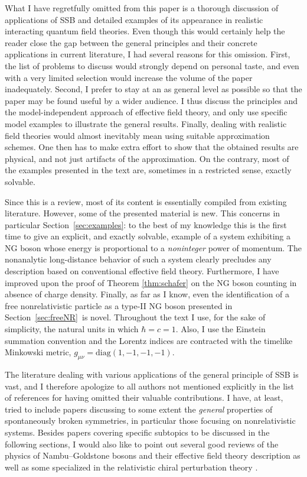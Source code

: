 \documentclass[final,3p,times,12pt,a4paper,sort&compress]{elsarticle}
\begin{document}
What I have regretfully omitted from this paper is a thorough discussion of
applications of SSB and detailed examples of its appearance in realistic
interacting quantum field theories. Even though this would certainly help the
reader close the gap between the general principles and their concrete
applications in current literature, I had several reasons for this omission.
First, the list of problems to discuss would strongly depend on personal taste,
and even with a very limited selection would increase the volume of the paper
inadequately. Second, I prefer to stay at an as general level as possible so
that the paper may be found useful by a wider audience. I thus discuss the
principles and the model-independent approach of effective field theory, and
only use specific model examples to illustrate the general results. Finally,
dealing with realistic field theories would almost inevitably mean using
suitable approximation schemes. One then has to make extra effort to show that
the obtained results are physical, and not just artifacts of the approximation.
On the contrary, most of the examples presented in the text are, sometimes in a
restricted sense, exactly solvable.

Since this is a review, most of its content is essentially compiled from
existing literature. However, some of the presented material is new. This
concerns in particular Section~\ref{sec:examples}: to the best of my knowledge
this is the first time to give an explicit, and exactly solvable, example of a
system exhibiting a NG boson whose energy is proportional to a \emph{noninteger}
power of momentum. The nonanalytic long-distance behavior of such a system
clearly precludes any description based on conventional effective field theory.
Furthermore, I have improved upon the proof of Theorem \ref{thm:schafer} on the
NG boson counting in absence of charge density. Finally, as far as I know, even
the identification of a free nonrelativistic particle as a type-II NG boson
presented in Section~\ref{sec:freeNR}\ is novel. Throughout the text I use, for
the sake of simplicity, the natural units in which $\hbar=c=1$. Also, I use the
Einstein summation convention and the Lorentz indices are contracted with the
timelike Minkowski metric, $g_{\mu\nu}=\mathrm{diag}(1,-1,-1,-1)$.

The literature dealing with various applications of the general principle of
SSB is vast, and I therefore apologize to all authors not mentioned explicitly
in the list of references for having omitted their valuable contributions. I
have, at least, tried to include papers discussing to some extent the
\emph{general} properties of spontaneously broken symmetries, in particular
those focusing on nonrelativistic systems. Besides papers covering specific
subtopics to be discussed in the following sections, I would also like to point
out several good reviews of the physics of Nambu--Goldstone bosons and their
effective field theory description
\cite{Georgi:1994qn,Kaplan:1995uv,Manohar:1996cq,Pich:1998xt,Burgess:1998ku}
as well as some specialized in the relativistic chiral perturbation theory
\cite{Scherer:2002tk,Bijnens:2006zp,Scherer:2009bt}.
\end{document}
